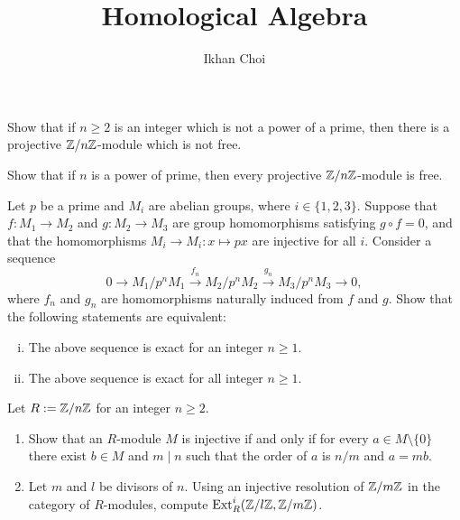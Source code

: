 \documentclass{../../../small}
\begin{document}
\title{Homological Algebra}
\author{Ikhan Choi}
\maketitle

\renewcommand{\theprb}{\arabic{prb}}

\begin{prb}
Show that if $n\ge2$ is an integer which is not a power of a prime, then there is a projective $\mathbb{Z}/n\mathbb{Z}$-module which is not free.
\end{prb}
\begin{sol}
\end{sol}

\begin{prb}
Show that if $n$ is a power of prime, then every projective $\mathbb{Z}/n\mathbb{Z}$-module is free.
\end{prb}
\begin{sol}
\end{sol}

\begin{prb}
Let $p$ be a prime and $M_i$ are abelian groups, where $i\in\{1,2,3\}$.
Suppose that $f:M_1\to M_2$ and $g:M_2\to M_3$ are group homomorphisms satisfying $g\circ f=0$, and that the homomorphisms $M_i\to M_i:x\mapsto px$ are injective for all $i$.
Consider a sequence
\[0\to M_1/p^nM_1\xrightarrow{f_n}M_2/p^nM_2\xrightarrow{g_n}M_3/p^nM_3\to0,\]
where $f_n$ and $g_n$ are homomorphisms naturally induced from $f$ and $g$.
Show that the following statements are equivalent:
\begin{enumerate}[(i)]
\item The above sequence is exact for an integer $n\ge1$.
\item The above sequence is exact for all integer $n\ge1$.
\end{enumerate}
\end{prb}
\begin{sol}
\end{sol}

\begin{prb}
Let $R:=\mathbb{Z}/n\mathbb{Z}$ for an integer $n\ge2$.
\begin{enumerate}[(1)]
\item Show that an $R$-module $M$ is injective if and only if for every $a\in M\setminus\{0\}$ there exist $b\in M$ and $m\mid n$ such that the order of $a$ is $n/m$ and $a=mb$.
\item Let $m$ and $l$ be divisors of $n$. Using an injective resolution of $\mathbb{Z}/m\mathbb{Z}$ in the category of $R$-modules, compute $\operatorname{Ext}_R^i(\mathbb{Z}/l\mathbb{Z},\mathbb{Z}/m\mathbb{Z})$.
\end{enumerate}
\end{prb}
\begin{sol}
\end{sol}
\end{document}
